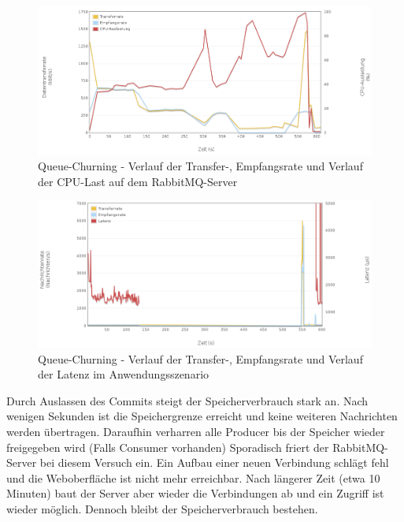 \documentclass[	a4paper,
			11pt,
			titlepage,
			oneside,
			fleqn,
			listof=totoc,
			parskip,
			numbers=noenddot]{scrartcl}
\begin{document}
		\begin{figure}[!htb]
			\centering
			\includegraphics[width=\textwidth]{img/queue/queue_server2.png}
			\caption{Queue-Churning - Verlauf der Transfer-, Empfangsrate und Verlauf der CPU-Last auf dem RabbitMQ-Server}
			\label{fig:queue-server2}
		\end{figure}
		
		\begin{figure}[!htb]
			\centering
			\includegraphics[width=\textwidth]{img/queue/queue_scenario.png}
			\caption{Queue-Churning - Verlauf der Transfer-, Empfangsrate und Verlauf der Latenz im Anwendungsszenario}
			\label{fig:queue-scenario}
		\end{figure}
	
	
	\clearpage
		{
		  \newline
		  \newline
		  \newline
		}{
		 Durch Auslassen des Commits steigt der Speicherverbrauch stark an. Nach wenigen Sekunden ist die Speichergrenze erreicht und keine weiteren Nachrichten werden übertragen. Daraufhin verharren alle Producer bis der Speicher wieder freigegeben wird (Falls Consumer vorhanden)
		}{
		 Sporadisch friert der RabbitMQ-Server bei diesem Versuch ein. Ein Aufbau einer neuen Verbindung schlägt fehl und die Weboberfläche ist nicht mehr erreichbar. Nach längerer Zeit (etwa 10 Minuten) baut der Server aber wieder die Verbindungen ab und ein Zugriff ist wieder möglich. Dennoch bleibt der Speicherverbrauch bestehen.
		}
\end{document}
